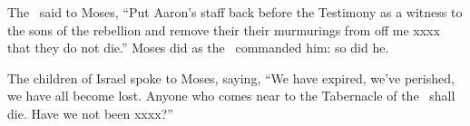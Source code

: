 \begin{inparaenum}
   The \lord\ said to Moses, ``Put Aaron's staff back before the Testimony as a witness to the sons of the rebellion and remove their their murmurings from off me xxxx that they do not die.''%
   Moses did as the \lord\ commanded him: so did he.%

   The children of Israel spoke to Moses, saying, ``We have expired, we've perished, we have all become lost.%
   Anyone who comes near to the Tabernacle of the \lord\ shall die. Have we not been xxxx?''%
\end{inparaenum}
